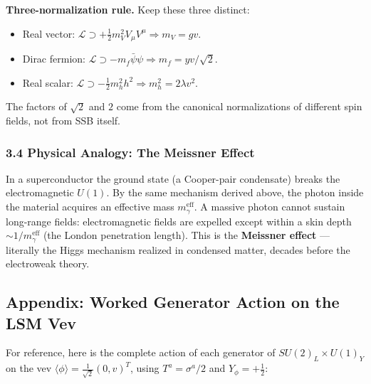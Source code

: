 \documentclass[12pt,a4paper]{article}
\newcommand{\nt}[1]{\begin{note}#1\end{note}}
\newcommand{\Lag}{\mathcal{L}}
\begin{document}
\nt{\textbf{Three-normalization rule.} Keep these three distinct:
\begin{itemize}
  \item Real vector: $\Lag \supset +\tfrac{1}{2}m_V^2 V_\mu V^\mu \Rightarrow m_V = gv$.
  \item Dirac fermion: $\Lag \supset -m_f\bar\psi\psi \Rightarrow m_f = yv/\sqrt{2}$.
  \item Real scalar: $\Lag \supset -\tfrac{1}{2}m_h^2 h^2 \Rightarrow m_h^2 = 2\lambda v^2$.
\end{itemize}
The factors of $\sqrt{2}$ and $2$ come from the canonical normalizations of different spin fields, not from SSB itself.}

\subsubsection*{3.4 \quad Physical Analogy: The Meissner Effect}

In a superconductor the ground state (a Cooper-pair condensate) breaks the electromagnetic $U(1)$. By the same mechanism derived above, the photon inside the material acquires an effective mass $m_\gamma^{\mathrm{eff}}$. A massive photon cannot sustain long-range fields: electromagnetic fields are expelled except within a skin depth $\sim 1/m_\gamma^{\mathrm{eff}}$ (the London penetration length). This is the \textbf{Meissner effect} — literally the Higgs mechanism realized in condensed matter, decades before the electroweak theory.

\subsection*{Appendix: Worked Generator Action on the LSM Vev}

For reference, here is the complete action of each generator of $SU(2)_L\times U(1)_Y$ on the vev $\langle\phi\rangle = \tfrac{1}{\sqrt{2}}(0,v)^T$, using $T^a = \sigma^a/2$ and $Y_\phi = +\tfrac{1}{2}$:
\end{document}
